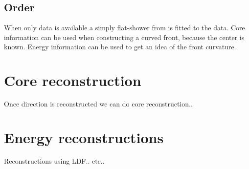 \subsection{Order}

When only data is available a simply flat-shower from is fitted to the
data. Core information can be used when constructing a curved front,
because the center is known. Energy information can be used to get an
idea of the front curvature.


\section{Core reconstruction}

Once direction is reconstructed we can do core reconstruction..


\section{Energy reconstructions}

Reconstructions using LDF.. etc..
